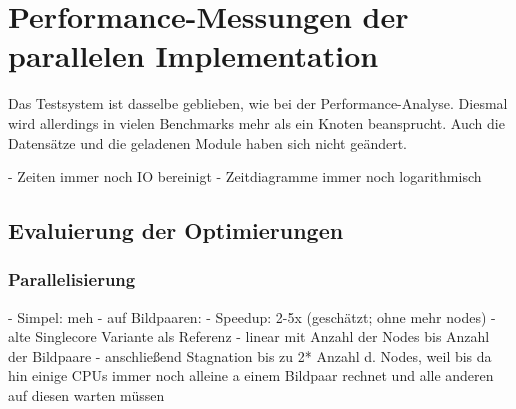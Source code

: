 \chapter{Performance-Messungen der parallelen Implementation}

Das Testsystem ist dasselbe geblieben, wie bei der Performance-Analyse. Diesmal wird allerdings in vielen Benchmarks mehr als ein Knoten beansprucht. Auch die Datensätze und die geladenen Module haben sich nicht geändert. 
\begin{correctmore}
	- Zeiten immer noch IO bereinigt
	- Zeitdiagramme immer noch logarithmisch
\end{correctmore}

\section{Evaluierung der Optimierungen}

\subsection{Parallelisierung}

\begin{correctmore}
	- Simpel: meh
	- auf Bildpaaren:
		- Speedup: 2-5x (geschätzt; ohne mehr nodes)
		- alte Singlecore Variante als Referenz
		- linear mit Anzahl der Nodes bis Anzahl der Bildpaare
		- anschließend Stagnation bis zu 2* Anzahl d. Nodes, weil bis da hin einige CPUs immer noch alleine a einem Bildpaar rechnet und alle anderen auf diesen warten müssen
\end{correctmore}

